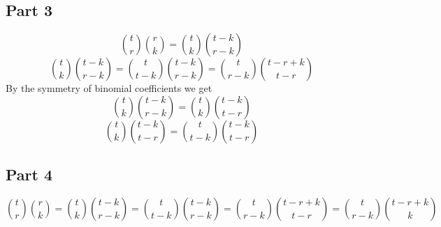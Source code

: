 \subsection{Part 3}\label{subsec:part-3}
\begin{equation}
    \binom{t}{r} \binom{r}{k} = \binom{t}{k} \binom{t-k}{r-k}
\end{equation}
\begin{equation}
    \binom{t}{k} \binom{t-k}{r-k} = \binom{t}{t-k} \binom{t-k}{r-k} = \binom{t}{r-k} \binom{t-r+k}{t-r}
\end{equation}
By the symmetry of binomial coefficients we get
\begin{equation}
    \binom{t}{k} \binom{t-k}{r-k} = \binom{t}{k} \binom{t-k}{t-r}
\end{equation}
\begin{equation}
    \binom{t}{k} \binom{t-k}{t-r} = \binom{t}{t-k} \binom{t-k}{t-r}
\end{equation}
\subsection{Part 4}\label{subsec:part-4}
\begin{equation}
    \binom{t}{r} \binom{r}{k} = \binom{t}{k} \binom{t-k}{r-k} = \binom{t}{t-k} \binom{t-k}{r-k} = \binom{t}{r-k} \binom{t-r+k}{t-r} = \binom{t}{r-k} \binom{t-r+k}{k}
\end{equation}